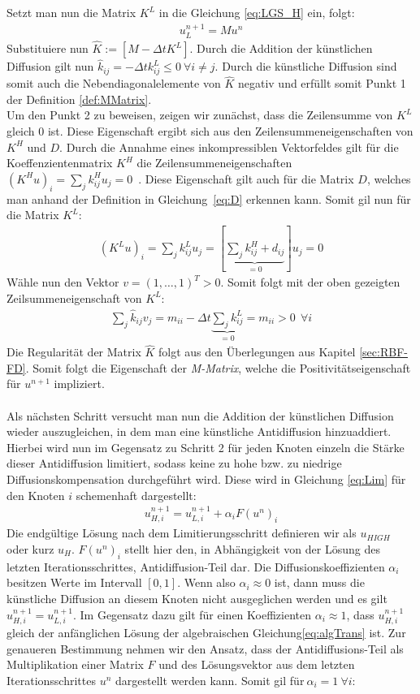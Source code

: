 \documentclass[a4paper,11pt]{article}
\begin{document}
Setzt man nun die Matrix $K^L$ in die Gleichung \eqref{eq:LGS_H} ein, folgt:
\begin{align}
 [M-\Delta tK^L]u_L^{n+1}=Mu^n
\end{align}
Substituiere nun $\widehat{K}:=[M-\Delta tK^L]$. Durch die Addition der künstlichen Diffusion gilt nun $\widehat{k}_{ij}=-\Delta tk_{ij}^L\le0~\forall i\neq j$. Durch die künstliche Diffusion sind somit auch die Nebendiagonalelemente von $\widehat{K}$ negativ und erfüllt somit Punkt 1 der Definition \ref{def:MMatrix}.\\
Um den Punkt 2 zu beweisen, zeigen wir zunächst, dass die Zeilensumme von $K^L$ gleich 0 ist. Diese Eigenschaft ergibt sich aus den Zeilensummeneigenschaften von $K^H$ und $D$. Durch die Annahme eines inkompressiblen Vektorfeldes gilt für die Koeffenzientenmatrix $K^H$ die Zeilensummeneigenschaften $(K^Hu)_i=\sum_{j}k_{ij}^Hu_j=0$~\cite{kuzmin2005algebraic}. Diese Eigenschaft gilt auch für die Matrix $D$, welches man anhand der Definition in Gleichung~\eqref{eq:D} erkennen kann. Somit gil nun für die Matrix $K^L$:
\begin{align}
 (K^Lu)_i=\sum_{j}k_{ij}^Lu_j=[\underbrace{\sum_{j}k_{ij}^H+d_{ij}}_{=0}]u_j=0
\end{align}
Wähle nun den Vektor $v=(1,\dots,1)^T>0$. Somit folgt mit der oben gezeigten Zeilsummeneigenschaft von $K^L$:
\begin{align}
 \sum_j \widehat{k}_{ij} v_j=m_{ii} - \Delta t\underbrace{\sum_j k_{ij}^L}_{=0}=m_{ii}>0~~\forall i
\end{align}
Die Regularität der Matrix $\widehat{K}$ folgt aus den Überlegungen aus Kapitel \ref{sec:RBF-FD}. Somit folgt die Eigenschaft der \textit{M-Matrix}, welche die Positivitätseigenschaft für $u^{n+1}$ impliziert.\\\\
Als nächsten Schritt versucht man nun die Addition der künstlichen Diffusion wieder auszugleichen, in dem man eine künstliche Antidiffusion hinzuaddiert. Hierbei wird nun im Gegensatz zu Schritt 2 für jeden Knoten einzeln die Stärke dieser Antidiffusion  limitiert, sodass keine zu hohe bzw. zu niedrige Diffusionskompensation durchgeführt wird. Diese wird in Gleichung \eqref{eq:Lim} für den Knoten $i$ schemenhaft dargestellt:
\begin{align}
 u_{H,i}^{n+1}=u_{L,i}^{n+1} +\alpha_iF(u^n)_i\label{eq:Lim}
\end{align}
Die endgültige Lösung nach dem Limitierungsschritt definieren wir als $u_{HIGH}$ oder kurz $u_H$. $F(u^n)_i$ stellt hier den, in Abhängigkeit von der Lösung des letzten Iterationsschrittes, Antidiffusion-Teil dar. Die Diffusionskoeffizienten $\alpha_i$  besitzen Werte im Intervall $[0,1]$. Wenn also $\alpha_i\approx0$ ist, dann muss die künstliche Diffusion an diesem Knoten nicht ausgeglichen werden und es gilt $u_{H,i}^{n+1}=u_{L,i}^{n+1}$. Im Gegensatz dazu gilt für einen Koeffizienten $\alpha_i\approx1$, dass $u_{H,i}^{n+1}$ gleich der anfänglichen Lösung der algebraischen Gleichung\eqref{eq:algTrans} ist. Zur genaueren Bestimmung nehmen wir den Ansatz, dass der Antidiffusions-Teil als Multiplikation einer Matrix $F$ und des Lösungsvektor aus dem letzten Iterationsschrittes $u^n$ dargestellt werden kann. Somit gil für$~\alpha_i=1~\forall i$:
\end{document}
